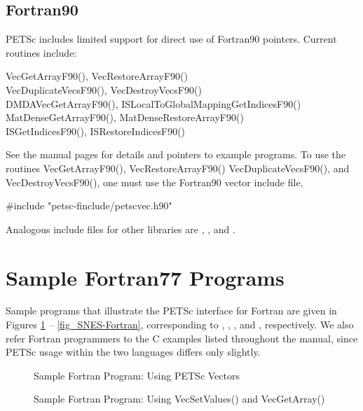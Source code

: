 \subsection{Fortran90}

PETSc includes limited support for direct use of Fortran90 pointers.
Current routines include:
\begin{tabbing}
 VecGetArrayF90(), VecRestoreArrayF90()\\
 VecDuplicateVecsF90(), VecDestroyVecsF90()\\
 DMDAVecGetArrayF90(), ISLocalToGlobalMappingGetIndicesF90()\\
 MatDenseGetArrayF90(), MatDenseRestoreArrayF90()\\
 ISGetIndicesF90(), ISRestoreIndicesF90()
\end{tabbing}
See the manual pages for details and pointers to example programs.  To
use the routines VecGetArrayF90(), VecRestoreArrayF90()
VecDuplicateVecsF90(), and VecDestroyVecsF90(), one must
use the Fortran90 vector include file,
\begin{tabbing}
    \#include "petsc-finclude/petscvec.h90"
\end{tabbing}
Analogous include files for other libraries are ,
, and .

\section{Sample Fortran77 Programs}
\label{sec_fortran-examples}

Sample programs that illustrate the PETSc interface for Fortran
are given in Figures \ref{fig_vec-Fortran} {\em --} \ref{fig_SNES-Fortran},
corresponding to
,
,
\break {}, and
, respectively.  We also
refer Fortran programmers to the C examples listed throughout the manual,
since PETSc usage within the two languages differs only slightly.

\begin{figure}[H]
{\small
{}
}
\caption{Sample Fortran Program:  Using PETSc Vectors}
\label{fig_vec-Fortran}
\end{figure}

\begin{figure}[H]
{\small
{}
}
\caption{Sample Fortran Program:  Using VecSetValues() and VecGetArray()}
\label{fig_vec2-Fortran}
\end{figure}

